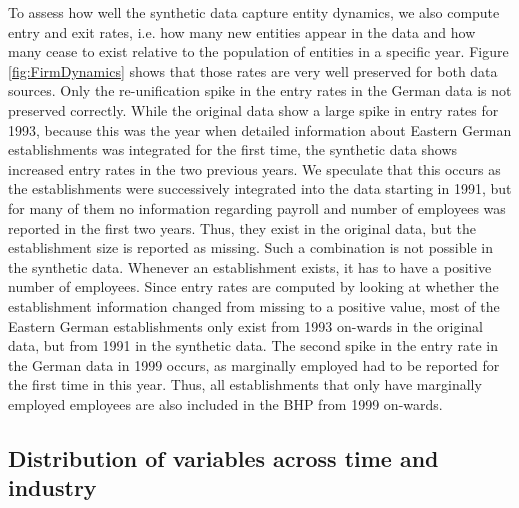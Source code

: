 To assess how well the synthetic data capture entity dynamics, we also compute entry and exit rates, i.e. how many new entities appear in the data and how many cease to exist relative to the population of entities in a specific year. Figure \ref{fig:FirmDynamics} shows that those rates are very well preserved for both data sources. Only the re-unification spike in the entry rates in the German data is not preserved correctly. While the original data show a large spike in entry rates for 1993, because this was the year when detailed information about Eastern German establishments was integrated for the first time, the synthetic data shows increased entry rates in the two previous years. We speculate that this occurs as the establishments were successively integrated into the data starting in 1991, but for many of them no information regarding payroll and number of employees was reported in the first two years. Thus, they exist in the original data, but the establishment size is reported as missing. Such a combination is not possible in the synthetic data. Whenever an establishment exists, it has to have a positive number of employees. Since entry rates are computed by looking at whether the establishment information changed from missing to a positive value, most of the Eastern German establishments only exist from 1993 on-wards in the original data, but from 1991 in the synthetic data.
The second spike in the entry rate in the German data in 1999 occurs, as marginally employed had to be reported for the first time in this year. Thus, all establishments that only have marginally employed employees are also included in the BHP from 1999 on-wards.





\subsection{Distribution of variables across time and industry}

